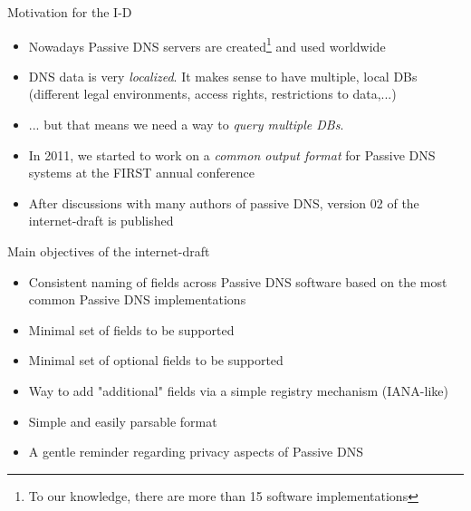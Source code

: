 \begin{frame}[t]{Motivation for the I-D}
\begin{itemize}
\item Nowadays Passive DNS servers are created\footnote{To our knowledge, there are more than 15 software implementations} and used worldwide
\item DNS data is very \emph{localized}. It makes sense to have multiple, local DBs (different legal environments, access rights, restrictions to data,...)
\item ... but that means we need a way to \emph{query multiple DBs}.
\item In 2011, we started to work on a \emph{common output format} for Passive DNS systems at the FIRST annual conference
\item After discussions with many authors of passive DNS, version 02 of the internet-draft is published
\end{itemize}
\end{frame}


\begin{frame}[t]{Main objectives of the internet-draft}
\begin{itemize}
\item Consistent naming of fields across Passive DNS software based on the most common Passive DNS implementations
\item Minimal set of fields to be supported
\item Minimal set of optional fields to be supported
\item Way to add "additional" fields via a simple registry mechanism (IANA-like)
\item Simple and easily parsable format
\item A gentle reminder regarding privacy aspects of Passive DNS
\end{itemize}
\end{frame}

